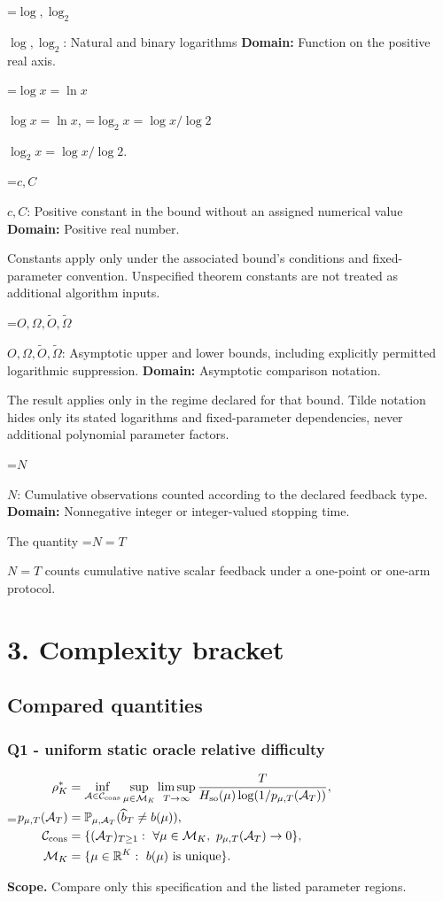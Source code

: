 \documentclass[10pt,a4paper]{article}
\newcommand{\AtlasMath}[1]{\par\begingroup\centering\setbox0=\hbox{$\displaystyle #1$}\ifdim\wd0>1.4\linewidth\typeout{ATLAS WIDE FORMULA: \the\wd0}\fi\ifdim\wd0>\linewidth\resizebox{\linewidth}{!}{\box0}\else\box0\fi\par\endgroup}
\newcommand{\AtlasInlineMath}[1]{\begingroup\setbox0=\hbox{$#1$}\ifdim\wd0>.4\linewidth\endgroup\AtlasMath{#1}\else\endgroup$#1$\fi}
\begin{document}
\AtlasInlineMath{\log,\log_2}: Natural and binary logarithms \textbf{Domain:} Function on the positive real axis.

\AtlasInlineMath{\log x=\ln x}, \AtlasInlineMath{\log_2x=\log x/\log2}.

\AtlasInlineMath{c,C}: Positive constant in the bound without an assigned numerical value \textbf{Domain:} Positive real number.

Constants apply only under the associated bound’s conditions and fixed-parameter convention. Unspecified theorem constants are not treated as additional algorithm inputs.

\AtlasInlineMath{O,\Omega,\widetilde O,\widetilde\Omega}: Asymptotic upper and lower bounds, including explicitly permitted logarithmic suppression. \textbf{Domain:} Asymptotic comparison notation.

The result applies only in the regime declared for that bound. Tilde notation hides only its stated logarithms and fixed-parameter dependencies, never additional polynomial parameter factors.

\AtlasInlineMath{N}: Cumulative observations counted according to the declared feedback type. \textbf{Domain:} Nonnegative integer or integer-valued stopping time.

The quantity \AtlasInlineMath{N=T} counts cumulative native scalar feedback under a one-point or one-arm protocol.

\section{3. Complexity bracket}
\subsection{Compared quantities}
\subsubsection{Q1 - uniform static oracle relative difficulty}
\AtlasMath{\begin{aligned} \rho_K^*&=\inf_{\mathcal A\in\mathcal C_{\rm cons}}\sup_{\mu\in\mathcal M_K}\limsup_{T\to\infty}\frac{T}{H_{\rm so}(\mu)\log(1/p_{\mu,T}(\mathcal A_T))},\\ p_{\mu,T}(\mathcal A_T)&=\mathbb P_{\mu,\mathcal A_T}(\widehat b_T\ne b(\mu)),\\ \mathcal C_{\rm cons}&=\{(\mathcal A_T)_{T\ge1}:\ \forall\mu\in\mathcal M_K,\ p_{\mu,T}(\mathcal A_T)\to0\},\\ \mathcal M_K&=\{\mu\in\mathbb R^K:\ b(\mu)\text{ is unique}\}.\end{aligned}}
\textbf{Scope.} Compare only this specification and the listed parameter regions.
\end{document}
